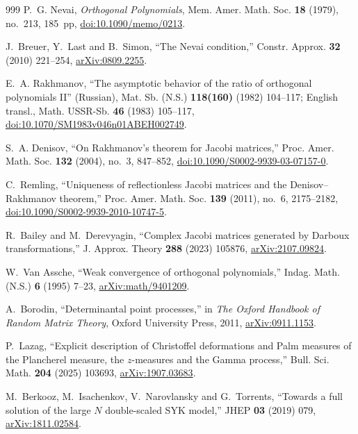 \documentclass[a4paper,11pt]{article}
\theoremstyle{definition}
\theoremstyle{remark}
\begin{document}
\begin{thebibliography}{999}
P.~G. Nevai, \emph{Orthogonal Polynomials}, Mem. Amer. Math. Soc. \textbf{18} (1979), no.~213, 185~pp,
\href{https://doi.org/10.1090/memo/0213}{doi:10.1090/memo/0213}.

J.~Breuer, Y.~Last and B.~Simon,
``The Nevai condition,''
Constr. Approx. \textbf{32} (2010) 221--254,
\href{https://arxiv.org/abs/0809.2255}{arXiv:0809.2255}.

E.~A. Rakhmanov,
``The asymptotic behavior of the ratio of orthogonal polynomials II'' (Russian),
Mat. Sb. (N.S.) \textbf{118(160)} (1982) 104--117;
English transl., Math. USSR-Sb. \textbf{46} (1983) 105--117,
\href{https://doi.org/10.1070/SM1983v046n01ABEH002749}{doi:10.1070/SM1983v046n01ABEH002749}.

S.~A. Denisov,
``On Rakhmanov's theorem for Jacobi matrices,''
Proc. Amer. Math. Soc. \textbf{132} (2004), no.~3, 847--852,
\href{https://doi.org/10.1090/S0002-9939-03-07157-0}{doi:10.1090/S0002-9939-03-07157-0}.

C.~Remling,
``Uniqueness of reflectionless Jacobi matrices and the Denisov--Rakhmanov theorem,''
Proc. Amer. Math. Soc. \textbf{139} (2011), no.~6, 2175--2182,
\href{https://doi.org/10.1090/S0002-9939-2010-10747-5}{doi:10.1090/S0002-9939-2010-10747-5}.

R.~Bailey and M.~Derevyagin,
``Complex Jacobi matrices generated by Darboux transformations,''
J. Approx. Theory \textbf{288} (2023) 105876,
\href{https://arxiv.org/abs/2107.09824}{arXiv:2107.09824}.

W.~Van Assche,
``Weak convergence of orthogonal polynomials,''
Indag. Math. (N.S.) \textbf{6} (1995) 7--23,
\href{https://arxiv.org/abs/math/9401209}{arXiv:math/9401209}.

A.~Borodin,
``Determinantal point processes,'' in
\emph{The Oxford Handbook of Random Matrix Theory},
Oxford University Press, 2011,
\href{https://arxiv.org/abs/0911.1153}{arXiv:0911.1153}.

P.~Lazag,
``Explicit description of Christoffel deformations and Palm measures of the Plancherel measure,
the $z$-measures and the Gamma process,''
Bull. Sci. Math. \textbf{204} (2025) 103693,
\href{https://arxiv.org/abs/1907.03683}{arXiv:1907.03683}.

M.~Berkooz, M.~Isachenkov, V.~Narovlansky and G.~Torrents,
``Towards a full solution of the large $N$ double-scaled SYK model,''
JHEP \textbf{03} (2019) 079,
\href{https://arxiv.org/abs/1811.02584}{arXiv:1811.02584}.


\end{thebibliography}
\end{document}
